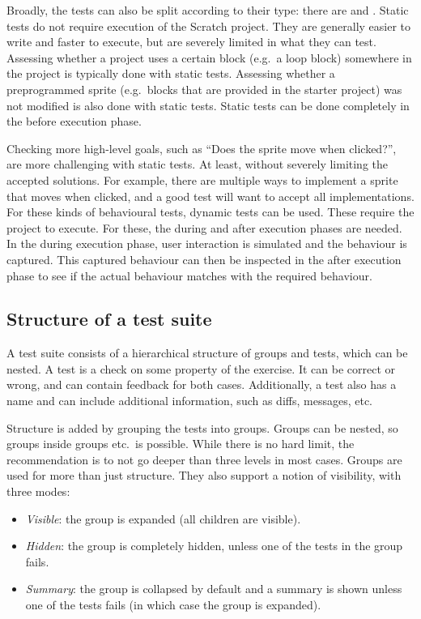 \documentclass[../main]{subfiles}
\begin{document}
Broadly, the tests can also be split according to their type: there are  and .
Static tests do not require execution of the Scratch project.
They are generally easier to write and faster to execute, but are severely limited in what they can test.
Assessing whether a project uses a certain block (e.g.\ a loop block) somewhere in the project is typically done with static tests.
Assessing whether a preprogrammed sprite (e.g.\ blocks that are provided in the starter project) was not modified is also done with static tests.
Static tests can be done completely in the before execution phase.

Checking more high-level goals, such as ``Does the sprite move when clicked?'', are more challenging with static tests.
At least, without severely limiting the accepted solutions.
For example, there are multiple ways to implement a sprite that moves when clicked, and a good test will want to accept all implementations.
For these kinds of behavioural tests, dynamic tests can be used.
These require the project to execute.
For these, the during and after execution phases are needed.
In the during execution phase, user interaction is simulated and the behaviour is captured.
This captured behaviour can then be inspected in the after execution phase to see if the actual behaviour matches with the required behaviour.

\subsection{Structure of a test suite}\label{subsec:structure-of-a-test-suite2}

A test suite consists of a hierarchical structure of groups and tests, which can be nested.
A test is a check on some property of the exercise.
It can be correct or wrong, and can contain feedback for both cases.
Additionally, a test also has a name and can include additional information, such as diffs, messages, etc.

Structure is added by grouping the tests into groups.
Groups can be nested, so groups inside groups etc.\ is possible.
While there is no hard limit, the recommendation is to not go deeper than three levels in most cases.
Groups are used for more than just structure.
They also support a notion of visibility, with three modes:

\begin{itemize}[noitemsep]
    \item \emph{Visible}: the group is expanded (all children are visible).
    \item \emph{Hidden}: the group is completely hidden, unless one of the tests in the group fails.
    \item \emph{Summary}: the group is collapsed by default and a summary is shown unless one of the tests fails (in which case the group is expanded).
\end{itemize}
\end{document}
